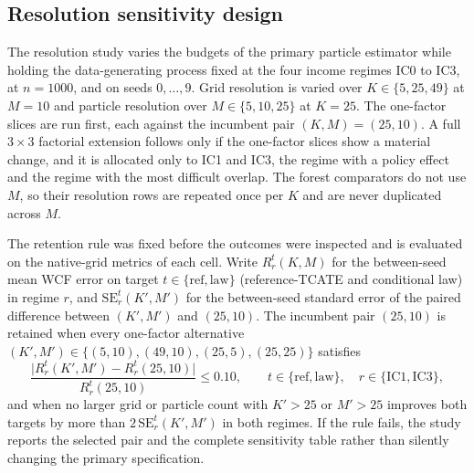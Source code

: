 \subsection{Resolution sensitivity design}\label{sec:resolution-design}

The resolution study varies the budgets of the primary particle estimator while holding the data-generating process fixed at the four income regimes IC0 to IC3, at $n=1000$, and on seeds $0,\ldots,9$. Grid resolution is varied over $K\in\{5,25,49\}$ at $M=10$ and particle resolution over $M\in\{5,10,25\}$ at $K=25$. The one-factor slices are run first, each against the incumbent pair $(K,M)=(25,10)$. A full $3\times3$ factorial extension follows only if the one-factor slices show a material change, and it is allocated only to IC1 and IC3, the regime with a policy effect and the regime with the most difficult overlap. The forest comparators do not use $M$, so their resolution rows are repeated once per $K$ and are never duplicated across $M$.

The retention rule was fixed before the outcomes were inspected and is evaluated on the native-grid metrics of each cell. Write $R^{t}_{r}(K,M)$ for the between-seed mean WCF error on target $t\in\{\mathrm{ref},\mathrm{law}\}$ (reference-TCATE and conditional law) in regime $r$, and $\mathrm{SE}^{t}_{r}(K',M')$ for the between-seed standard error of the paired difference between $(K',M')$ and $(25,10)$. The incumbent pair $(25,10)$ is retained when every one-factor alternative $(K',M')\in\{(5,10),(49,10),(25,5),(25,25)\}$ satisfies
\begin{equation}\label{eq:sens-retention-rule}
\frac{\lvert R^{t}_{r}(K',M')-R^{t}_{r}(25,10)\rvert}{R^{t}_{r}(25,10)}\le 0.10,
\qquad t\in\{\mathrm{ref},\mathrm{law}\},\quad r\in\{\mathrm{IC1},\mathrm{IC3}\},
\end{equation}
and when no larger grid or particle count with $K'>25$ or $M'>25$ improves both targets by more than $2\,\mathrm{SE}^{t}_{r}(K',M')$ in both regimes. If the rule fails, the study reports the selected pair and the complete sensitivity table rather than silently changing the primary specification.

